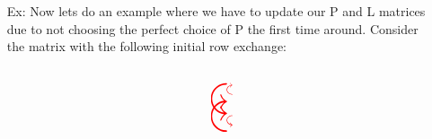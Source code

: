 \documentclass[reqno]{amsart}
\theoremstyle{definition}
\begin{document}
\begin{itemize}
\pagebreak

\item[Ex:  ]  Now lets do an example where we have to update our P and L matrices due to not choosing the perfect choice of P the first time around.  Consider the matrix
with the following initial row exchange:
%
\begin{equation*}
\begin{matrix}
\stackinset{l}{0pt}{t}{6pt}{\resizebox{12pt}{32pt}{\curvearrowdown}}{}\\
\\
\\

\end{matrix}\begin{matrix}
\\
\vspace{-14pt}\resizebox{12pt}{32pt}{\curvearrowup}\\
\\

\end{matrix}\begin{matrix}
\curvearrowup\\
\\
\curvearrowdown\\


\end{matrix}
\end{equation*}
\end{itemize}
\end{document}
